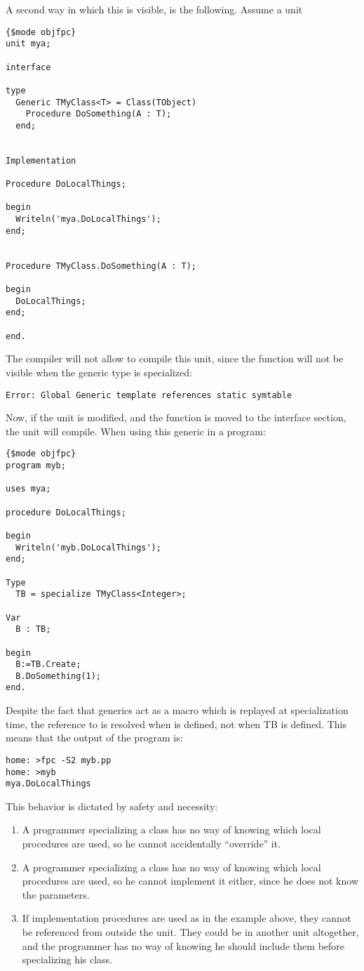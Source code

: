 A second way in which this is visible, is the following. Assume a unit
\begin{verbatim}
{$mode objfpc}
unit mya;

interface

type
  Generic TMyClass<T> = Class(TObject)
    Procedure DoSomething(A : T);
  end;


Implementation

Procedure DoLocalThings;

begin
  Writeln('mya.DoLocalThings');
end;


Procedure TMyClass.DoSomething(A : T);

begin
  DoLocalThings;
end;

end.
\end{verbatim}
The compiler will not allow to compile this unit, since the  function will not be visible when the generic type is specialized:
\begin{verbatim}
Error: Global Generic template references static symtable
\end{verbatim}
Now, if the unit is modified, and the  function  is moved to the interface section, the unit will compile.
When using this generic in a program:
\begin{verbatim}
{$mode objfpc}
program myb;

uses mya;

procedure DoLocalThings;

begin
  Writeln('myb.DoLocalThings');
end;

Type
  TB = specialize TMyClass<Integer>;

Var
  B : TB;

begin
  B:=TB.Create;
  B.DoSomething(1);
end.
\end{verbatim}
Despite the fact that generics act as a macro which is replayed at specialization time, the reference to  is resolved
when  is defined, not when TB is defined. This means that the output of the program is:
\begin{verbatim}
home: >fpc -S2 myb.pp
home: >myb
mya.DoLocalThings
\end{verbatim}
This behavior is dictated by safety and necessity:
\begin{enumerate}
\item A programmer specializing a class has no way of knowing which local
procedures are used, so he cannot accidentally ``override'' it.
\item A programmer specializing a class has no way of knowing which local
procedures are used, so he cannot implement it either, since he does not
know the parameters.
\item If implementation procedures are used as in the example above, they
cannot be referenced from outside the unit. They could be in another unit
altogether, and the programmer has no way of knowing he should include them
before specializing his class.
\end{enumerate}


